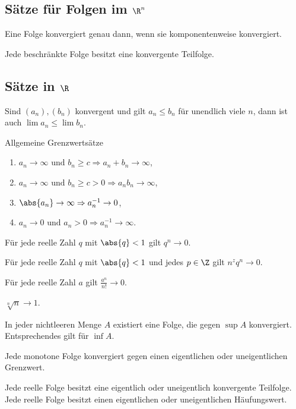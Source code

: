 \subsection{Sätze für Folgen im $\R^n$}

\begin{prop}
Eine Folge konvergiert genau dann, wenn sie komponentenweise konvergiert.
\end{prop}
\begin{prop}
Jede beschränkte Folge besitzt eine konvergente Teilfolge.
\end{prop}

\subsection{Sätze in $\R$}

\begin{prop}
Sind $(a_n),(b_n)$ konvergent und gilt $a_n \le b_n$ für unendlich viele $n$,
dann ist auch $\lim a_n \le \lim b_n$.
\end{prop}
\begin{prop}
Allgemeine Grenzwertsätze
\begin{enumerate}
  \item $a_n \to \infty \text{ und } b_n \ge c \Rightarrow a_n + b_n \to
  \infty$,
  \item $a_n \to \infty \text{ und } b_n \ge c > 0 \Rightarrow a_nb_n \to
  \infty$,
  \item $\abs{a_n} \to \infty  \Rightarrow a_n^{-1} \to 0$,
  \item $a_n \to 0 \text{ und } a_n > 0 \Rightarrow a_n^{-1} \to \infty$.
\end{enumerate}
\end{prop}
\begin{prop}
Für jede reelle Zahl $q$ mit $\abs{q} < 1$ gilt $q^n \to 0$.
\end{prop}
\begin{prop}
Für jede reelle Zahl $q$ mit $\abs{q} < 1$ und jedes $p\in\Z$ gilt $n^zq^n \to
0$.
\end{prop}
\begin{prop}
Für jede reelle Zahl $a$ gilt $\frac{a^n}{n!} \to
0$.
\end{prop}
\begin{prop}
$\sqrt[n]{n} \to 1$.
\end{prop}
\begin{prop}
In jeder nichtleeren Menge $A$ existiert eine Folge, die gegen $\sup A$
konvergiert. Entsprechendes gilt für $\inf A$.
\end{prop}
\begin{prop}
Jede monotone Folge konvergiert gegen einen eigentlichen oder uneigentlichen
Grenzwert.
\end{prop}
\begin{prop}
Jede reelle Folge besitzt eine eigentlich oder uneigentlich konvergente
Teilfolge.\\
Jede reelle Folge besitzt einen eigentlichen oder uneigentlichen
Häufungswert.
\end{prop}